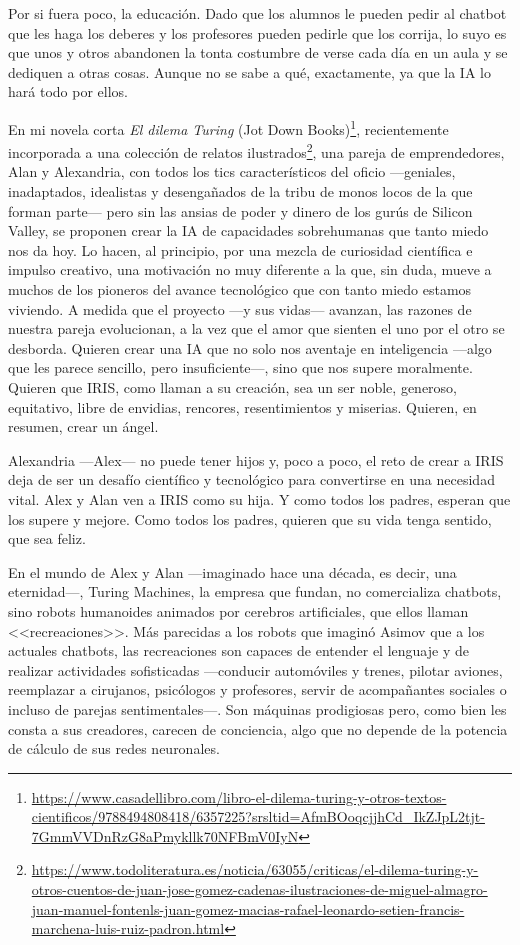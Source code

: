 \documentclass[11pt,a4paper]{article}
\begin{document}
Por si fuera poco, la educación. Dado que los alumnos le pueden pedir al chatbot que les haga los deberes y los profesores pueden pedirle que los corrija, lo suyo es que unos y otros abandonen la tonta costumbre de verse cada día en un aula y se dediquen a otras cosas. Aunque no se sabe a qué, exactamente, ya que la IA lo hará todo por ellos. 

En mi novela corta \emph{El dilema Turing} (Jot Down Books)\footnote{\url{https://www.casadellibro.com/libro-el-dilema-turing-y-otros-textos-cientificos/9788494808418/6357225?srsltid=AfmBOoqcjjhCd_IkZJpL2tjt-7GmmVVDnRzG8aPmykllk70NFBmV0IyN}}, recientemente incorporada a una colección de relatos ilustrados\footnote{\url{https://www.todoliteratura.es/noticia/63055/criticas/el-dilema-turing-y-otros-cuentos-de-juan-jose-gomez-cadenas-ilustraciones-de-miguel-almagro-juan-manuel-fontenls-juan-gomez-macias-rafael-leonardo-setien-francis-marchena-luis-ruiz-padron.html}}, una pareja de emprendedores, Alan y Alexandria, con todos los tics característicos del oficio ---geniales, inadaptados, idealistas y desengañados de la tribu de monos locos de la que forman parte--- pero sin las ansias de poder y dinero de los gurús de Silicon Valley, se proponen crear la IA de capacidades sobrehumanas que tanto miedo nos da hoy. Lo hacen, al principio, por una mezcla de curiosidad científica e impulso creativo, una motivación no muy diferente a la que, sin duda, mueve a muchos de los pioneros del avance tecnológico que con tanto miedo estamos viviendo. A medida que el proyecto ---y sus vidas--- avanzan, las razones de nuestra pareja evolucionan, a la vez que el amor que sienten el uno por el otro se desborda. Quieren crear una IA que no solo nos aventaje en inteligencia ---algo que les parece sencillo, pero insuficiente---, sino que nos supere moralmente. Quieren que IRIS, como llaman a su creación, sea un ser noble, generoso, equitativo, libre de envidias, rencores, resentimientos y miserias. Quieren, en resumen, crear un ángel.  

Alexandria ---Alex--- no puede tener hijos y, poco a poco, el reto de crear a IRIS deja de ser un desafío científico y tecnológico para convertirse en una necesidad vital. Alex y Alan ven a IRIS como su hija. Y como todos los padres, esperan que los supere y mejore. Como todos los padres, quieren que su vida tenga sentido, que sea feliz. 

En el mundo de Alex y Alan ---imaginado hace una década, es decir, una eternidad---, Turing Machines, la empresa que fundan, no comercializa chatbots, sino robots humanoides animados por cerebros artificiales, que ellos llaman <<recreaciones>>. Más parecidas a los robots que imaginó Asimov que a los actuales chatbots, las recreaciones son capaces de entender el lenguaje y de realizar actividades sofisticadas ---conducir automóviles y trenes, pilotar aviones, reemplazar a cirujanos, psicólogos y profesores, servir de acompañantes sociales o incluso de parejas sentimentales---. Son máquinas prodigiosas pero, como bien les consta a sus creadores, carecen de conciencia, algo que no depende de la potencia de cálculo de sus redes neuronales.
\end{document}
